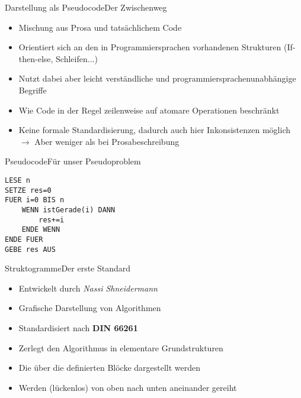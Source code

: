 \begin{frame}{Darstellung als Pseudocode}{Der Zwischenweg}
    \begin{itemize}
        \item Mischung aus Prosa und tatsächlichem Code
        \item Orientiert sich an den in Programmiersprachen vorhandenen Strukturen (If-then-else, Schleifen...)
        \item Nutzt dabei aber leicht verständliche und programmiersprachenunabhängige Begriffe
        \item Wie Code in der Regel zeilenweise auf atomare Operationen beschränkt
        \item Keine formale Standardisierung, dadurch auch hier Inkonsistenzen möglich $\rightarrow$ Aber weniger als bei Prosabeschreibung
    \end{itemize}
\end{frame}

\begin{frame}[fragile]{Pseudocode}{Für unser Pseudoproblem}
\lstset{style=pseudo}
\begin{lstlisting}
LESE n
SETZE res=0
FUER i=0 BIS n
    WENN istGerade(i) DANN
        res+=i
    ENDE WENN
ENDE FUER
GEBE res AUS
\end{lstlisting}
\end{frame}

\begin{frame}{Struktogramme}{Der erste Standard}
    \begin{itemize}
        \item Entwickelt durch \textit{Nassi Shneidermann}
        \item Grafische Darstellung von Algorithmen
        \item Standardisiert nach \textbf{DIN 66261}
        \item Zerlegt den Algorithmus in elementare Grundstrukturen
        \item Die über die definierten Blöcke dargestellt werden
        \item Werden (lückenlos) von oben nach unten aneinander gereiht
    \end{itemize}
\end{frame}

